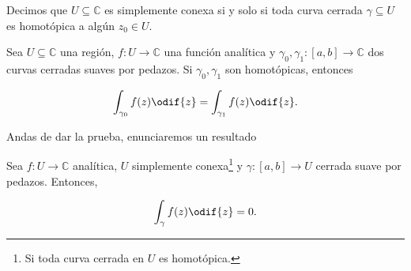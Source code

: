 \documentclass[../main.tex]{subfiles}
\begin{document}
\begin{definition}
    Decimos que \(U \subseteq \mathbb{C}\) es simplemente conexa si y solo si toda curva
    cerrada \(\gamma \subseteq U\) es homotópica a algún \(z_{0} \in U\).
\end{definition}

\begin{theorem}\label{thm:Cauchy-Homotopies}
    Sea \(U \subseteq \mathbb{C}\) una región, \(f \colon U \to \mathbb{C}\) una función
    analítica y \(\gamma_{0}, \gamma_{1} \colon [a, b] \to \mathbb{C}\) dos curvas
    cerradas suaves por pedazos. Si \(\gamma_{0}, \gamma_{1}\) son homotópicas, entonces

    \begin{equation*}
        \int_{\gamma_{0}}^{}f(z)\odif{z} = \int_{\gamma_{1}}^{}f(z)\odif{z}.
    \end{equation*}
\end{theorem}

Andas de dar la prueba, enunciaremos un resultado

\begin{corollary}
    Sea \(f \colon U \to \mathbb{C}\) analítica, \(U\) simplemente
    conexa\footnote{Si toda
    curva cerrada en \(U\) es homotópica.} y \(\gamma \colon [a, b] \to U\)
    cerrada suave
    por pedazos. Entonces,

    \begin{equation*}
        \int_{\gamma}^{}f(z)\odif{z} = 0.
    \end{equation*}
\end{corollary}
\end{document}
